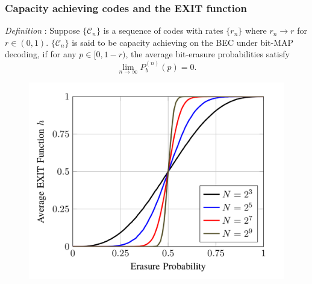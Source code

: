 \documentclass[xcolor=dvipsnames]{beamer}
\begin{document}
\begin{frame}
\frametitle{Capacity achieving codes and the EXIT function}
\emph{Definition} : Suppose $\{\mathcal{C}_n\}$ is a sequence of codes with rates $\{r_n\}$ where $r_n \to r$ for $r \in (0,1)$. $\{\mathcal{C}_n\}$ is said to be {\color{blue(ryb)}capacity achieving} on the BEC under bit-MAP decoding, if for any $p \in [0, 1-r)$, the average bit-erasure probabilities satisfy $$\lim_{n \to \infty} P_b^{(n)}(p) = 0.$$
\begin{figure}[!htb]
\begin{center}
\includegraphics[scale=0.18]{./figures/exitfun.png}
\label{fig:exitfun}
\end{center}
\end{figure}
\end{frame}
\end{document}

